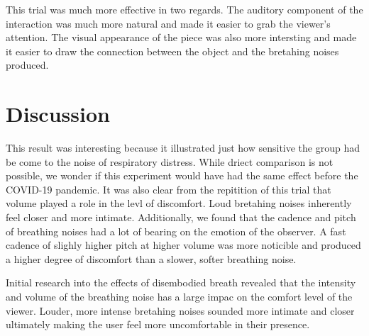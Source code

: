 \documentclass[letterpaper]{article}
\begin{document}
This trial was much more effective in two regards. The auditory component of the interaction was much more natural and made it easier to grab the viewer's attention. The visual appearance of the piece was also more intersting and made it easier to draw the connection between the object and the bretahing noises produced. 



\section{Discussion}


This result was interesting because it illustrated just how sensitive the group had be come to the noise of respiratory distress. While driect comparison is not possible, we wonder if this experiment would have had the same effect before the COVID-19 pandemic. It was also clear from the repitition of this trial that volume played a role in the levl of discomfort. Loud bretahing noises inherently feel closer and more intimate. Additionally, we found that the cadence and pitch of breathing noises had a lot of bearing on the emotion of the observer. A fast cadence of slighly higher pitch at higher volume was more noticible and produced a higher degree of discomfort than a slower, softer breathing noise.  

Initial research into the effects of disembodied breath revealed that the intensity and volume of the breathing noise has a large impac on the comfort level of the viewer. Louder, more intense bretahing noises sounded more intimate and closer ultimately making the user feel more uncomfortable in their presence. 
\end{document}
